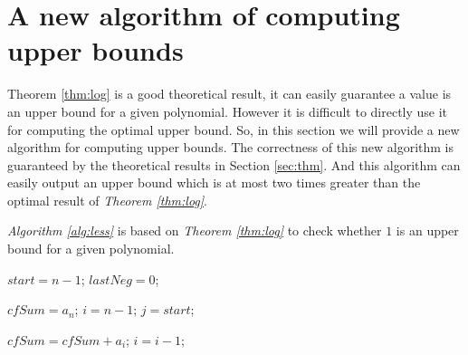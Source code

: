 
\section{A new algorithm of computing upper bounds}
\label{sec:alg}

Theorem \ref{thm:log} is a good theoretical result, it can easily guarantee  a value is an upper bound for a given polynomial. However it is difficult to directly use it for computing the optimal upper bound. So,  in this section we will provide a new algorithm for computing upper bounds. The correctness of this new algorithm is guaranteed by the theoretical results in Section \ref{sec:thm}. And this algorithm can easily output an upper bound which is at most two times greater than the optimal result of {\em Theorem \ref{thm:log}}.

{\em Algorithm \ref{alg:less}} is based on {\em Theorem \ref{thm:log}} to check whether $1$ is an upper bound for a given polynomial.


\begin{algorithm}
	\caption{\less \label{alg:less}}
	\DontPrintSemicolon
	
	$start=n-1$;
	$lastNeg=0$;\;
	
	
	$cfSum=a_n$;
	$i=n-1$;
	$j=start$;\;
	{
		{
			
			$cfSum=cfSum+a_i$;
			$i=i-1$;\;
			
		}
}

\end{algorithm}

